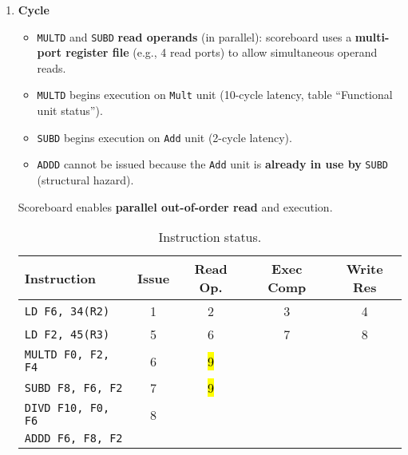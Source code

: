 \begin{enumerate}
    \newpage


    \item \textbf{Cycle \theenumi}
    \begin{itemize}
        \item[\textcolor{Green3}{\faIcon{check}}] \texttt{MULTD} and \texttt{SUBD} \textbf{read operands} (in parallel): scoreboard uses a \textbf{multi-port register file} (e.g., 4 read ports) to allow simultaneous operand reads.
        \item \texttt{MULTD} begins execution on \texttt{Mult} unit (10-cycle latency, table ``Functional unit status'').
        \item \texttt{SUBD} begins execution on \texttt{Add} unit (2-cycle latency).
        \item[\textcolor{Red2}{\faIcon{times}}] \texttt{ADDD} cannot be issued because the \texttt{Add} unit is \textbf{already in use by} \texttt{SUBD} (structural hazard).
    \end{itemize}
    Scoreboard enables \textbf{parallel out-of-order read} and execution.

    \begin{table}[!htp]
        \centering
        \begin{tabular}{@{} l | c c c c @{}}
            \toprule
            Instruction                 & Issue & Read Op.  & Exec Comp & Write Res \\
            \midrule
            \texttt{LD    F6, 34(R2)}   & 1     & 2         & 3         & 4         \\ [.3em]
            \texttt{LD    F2, 45(R3)}   & 5     & 6         & 7         & 8         \\ [.3em]
            \texttt{MULTD F0, F2, F4}   & 6     & \hl{9}    &           &           \\ [.3em]
            \texttt{SUBD  F8, F6, F2}   & 7     & \hl{9}    &           &           \\ [.3em]
            \texttt{DIVD  F10, F0, F6}  & 8     &           &           &           \\ [.3em]
            \texttt{ADDD  F6, F8, F2}   &       &           &           &           \\
            \bottomrule
        \end{tabular}
        \caption*{Instruction status.}
    \end{table}


\end{enumerate}
